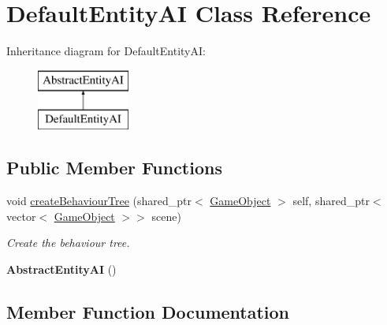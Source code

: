 \hypertarget{class_default_entity_a_i}{}\section{Default\+Entity\+AI Class Reference}
\label{class_default_entity_a_i}
Inheritance diagram for Default\+Entity\+AI\+:\begin{figure}[H]
\begin{center}
\leavevmode
\includegraphics[height=2.000000cm]{class_default_entity_a_i}
\end{center}
\end{figure}
\subsection*{Public Member Functions}
\begin{DoxyCompactItemize}
\item 
void \mbox{\hyperlink{class_default_entity_a_i_a86fb7d0e18f1e3de4dd1fb3aea5acf84}{create\+Behaviour\+Tree}} (shared\+\_\+ptr$<$ \mbox{\hyperlink{class_game_object}{Game\+Object}} $>$ self, shared\+\_\+ptr$<$ vector$<$ \mbox{\hyperlink{class_game_object}{Game\+Object}} $>$$>$ scene)
\begin{DoxyCompactList}\small\item\em Create the behaviour tree. \end{DoxyCompactList}\item 
\mbox{\label{class_default_entity_a_i_a4234e9abd92d2e26a69d318fc3491dc1}} 
{\bfseries Abstract\+Entity\+AI} ()
\end{DoxyCompactItemize}


\subsection{Member Function Documentation}
\mbox{\label{class_default_entity_a_i_a86fb7d0e18f1e3de4dd1fb3aea5acf84}} 
